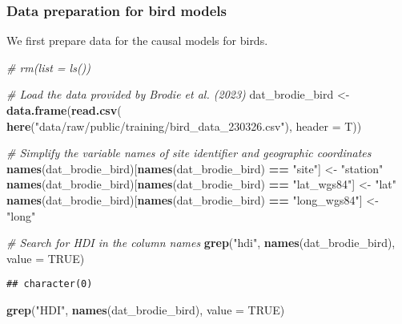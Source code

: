 \documentclass[
]{article}
\newenvironment{Shaded}{\begin{snugshade}}{\end{snugshade}}
\newcommand{\AttributeTok}[1]{\textcolor[rgb]{0.13,0.29,0.53}{#1}}
\newcommand{\CommentTok}[1]{\textcolor[rgb]{0.56,0.35,0.01}{\textit{#1}}}
\newcommand{\ConstantTok}[1]{\textcolor[rgb]{0.56,0.35,0.01}{#1}}
\newcommand{\FunctionTok}[1]{\textcolor[rgb]{0.13,0.29,0.53}{\textbf{#1}}}
\newcommand{\NormalTok}[1]{#1}
\newcommand{\OtherTok}[1]{\textcolor[rgb]{0.56,0.35,0.01}{#1}}
\newcommand{\SpecialCharTok}[1]{\textcolor[rgb]{0.81,0.36,0.00}{\textbf{#1}}}
\newcommand{\StringTok}[1]{\textcolor[rgb]{0.31,0.60,0.02}{#1}}
\begin{document}
\hypertarget{data-preparation-for-bird-models}{%
\subsubsection{Data preparation for bird
models}\label{data-preparation-for-bird-models}}

We first prepare data for the causal models for birds.

\begin{Shaded}
\begin{Highlighting}[]
\CommentTok{\# rm(list = ls())}

\CommentTok{\# Load the data provided by Brodie et al. (2023)}
\NormalTok{dat\_brodie\_bird }\OtherTok{\textless{}{-}} \FunctionTok{data.frame}\NormalTok{(}\FunctionTok{read.csv}\NormalTok{(}
                          \FunctionTok{here}\NormalTok{(}\StringTok{"data/raw/public/training/bird\_data\_230326.csv"}\NormalTok{), }
                          \AttributeTok{header =}\NormalTok{ T))}

\CommentTok{\# Simplify the variable names of site identifier and geographic coordinates}
\FunctionTok{names}\NormalTok{(dat\_brodie\_bird)[}\FunctionTok{names}\NormalTok{(dat\_brodie\_bird) }\SpecialCharTok{==} \StringTok{"site"}\NormalTok{] }\OtherTok{\textless{}{-}} \StringTok{"station"}
\FunctionTok{names}\NormalTok{(dat\_brodie\_bird)[}\FunctionTok{names}\NormalTok{(dat\_brodie\_bird) }\SpecialCharTok{==} \StringTok{"lat\_wgs84"}\NormalTok{] }\OtherTok{\textless{}{-}} \StringTok{"lat"}
\FunctionTok{names}\NormalTok{(dat\_brodie\_bird)[}\FunctionTok{names}\NormalTok{(dat\_brodie\_bird) }\SpecialCharTok{==} \StringTok{"long\_wgs84"}\NormalTok{] }\OtherTok{\textless{}{-}} \StringTok{"long"}

\CommentTok{\# Search for HDI in the column names }
\FunctionTok{grep}\NormalTok{(}\StringTok{"hdi"}\NormalTok{, }\FunctionTok{names}\NormalTok{(dat\_brodie\_bird), }\AttributeTok{value =} \ConstantTok{TRUE}\NormalTok{)}
\end{Highlighting}
\end{Shaded}

\begin{verbatim}
## character(0)
\end{verbatim}

\begin{Shaded}
\begin{Highlighting}[]
\FunctionTok{grep}\NormalTok{(}\StringTok{"HDI"}\NormalTok{, }\FunctionTok{names}\NormalTok{(dat\_brodie\_bird), }\AttributeTok{value =} \ConstantTok{TRUE}\NormalTok{)}
\end{Highlighting}
\end{Shaded}
\end{document}
